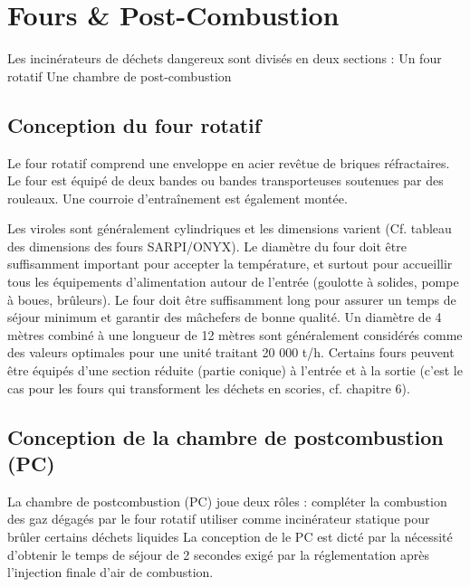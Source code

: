 \section{Fours \& Post-Combustion}

Les incinérateurs de déchets dangereux sont divisés en deux sections :
Un four rotatif
Une chambre de post-combustion

\subsection{Conception du four rotatif}
Le four rotatif comprend une enveloppe en acier revêtue de briques réfractaires.
Le four est équipé de deux bandes ou bandes transporteuses soutenues par des rouleaux. Une courroie d'entraînement est également montée.

\vspace{0.3cm}
Les viroles sont généralement cylindriques et les dimensions varient (Cf. tableau des dimensions des fours SARPI/ONYX).
\vspace{0.3cm}
Le diamètre du four doit être suffisamment important pour accepter la température, et surtout pour accueillir tous les équipements d'alimentation autour de l'entrée (goulotte à solides, pompe à boues, brûleurs).
Le four doit être suffisamment long pour assurer un temps de séjour minimum et garantir des mâchefers de bonne qualité.
\vspace{0.3cm}
Un diamètre de 4 mètres combiné à une longueur de 12 mètres sont généralement considérés comme des valeurs optimales pour une unité traitant 20 000 t/h.
\vspace{0.3cm}
Certains fours peuvent être équipés d'une section réduite (partie conique) à l'entrée et à la sortie (c'est le cas pour les fours qui transforment les déchets en scories, cf. chapitre 6).

\subsection{Conception de la chambre de postcombustion (PC)}

La chambre de postcombustion (PC) joue deux rôles :
compléter la combustion des gaz dégagés par le four rotatif
utiliser comme incinérateur statique pour brûler certains déchets liquides
\vspace{0.3cm}
La conception de le PC est dicté par la nécessité d'obtenir le temps de séjour de 2 secondes exigé par la réglementation après l'injection finale d'air de combustion.


